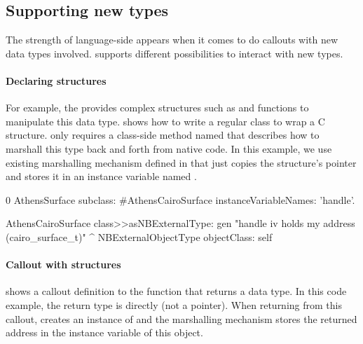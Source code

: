 \subsection{Supporting new types}

The strength of language-side \FFIs appears when it comes to do callouts with new data types involved.
\NBFFI supports different possibilities to interact with new types.

\paragraph{Declaring structures}
For example, the  provides complex structures such as  and functions to manipulate this data type. %
 shows how to write a regular \PH class to wrap a C structure.
\NB only requires a class-side method named  that describes how to marshall this type back and forth from native code.
In this example, we use existing marshalling mechanism defined in  that just copies the structure's pointer and stores it in an instance variable named .

\begin{stcode}[
	label={lst:ffi-AthensCairoSurface},
	caption={Example of C structure wrapping in \NB}]{0}
AthensSurface subclass: #AthensCairoSurface
	instanceVariableNames: 'handle'.

AthensCairoSurface class>>asNBExternalType: gen
	"handle iv holds my address (cairo_surface_t)"
	^ NBExternalObjectType objectClass: self
\end{stcode}

\paragraph{Callout with structures}
 shows a callout definition to the  function that returns a  data type.
In this code example, the return type is  directly (not a pointer).
When returning from this callout, \NB creates an instance of  and the marshalling mechanism  stores the returned address in the  instance variable of this object.

